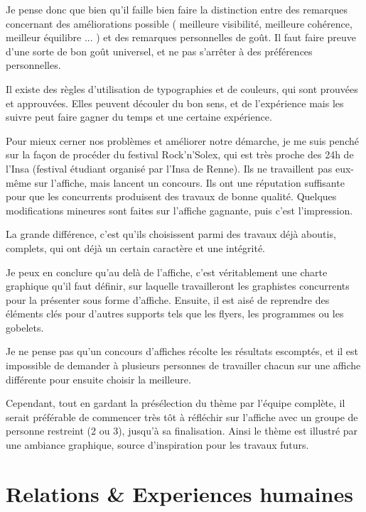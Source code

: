         Je pense donc que bien qu'il faille bien faire la distinction entre des remarques concernant des améliorations possible ( meilleure visibilité, meilleure cohérence, meilleur équilibre ... ) et des remarques personnelles de goût.
        Il faut faire preuve d'une sorte de bon goût universel, et ne pas s'arrêter à des préférences personnelles.
        
        Il existe des règles d'utilisation de typographies et de couleurs, qui sont prouvées  et approuvées. Elles peuvent découler du bon sens, et de l'expérience mais les suivre peut faire gagner du temps et une certaine expérience.

        
        Pour mieux cerner nos problèmes et améliorer notre démarche, je me suis penché sur la façon de procéder du festival Rock'n'Solex, qui est très proche des 24h de l'Insa (festival étudiant organisé par l'Insa de Renne).
        Ils ne travaillent pas eux-même sur l'affiche, mais lancent un concours. Ils ont une réputation suffisante pour que les concurrents produisent des travaux de bonne qualité.
        Quelques modifications mineures sont faites sur l'affiche gagnante, puis c'est l'impression.
        
        La grande différence, c'est qu'ils choisissent parmi des travaux déjà aboutis, complets, qui ont déjà un certain caractère et une intégrité. 
        
        Je peux en conclure qu'au delà de l'affiche, c'est véritablement une charte graphique qu'il faut définir, sur laquelle travailleront les graphistes concurrents pour la présenter sous forme d'affiche. Ensuite, il est aisé de reprendre des éléments clés pour d'autres supports tels que les flyers, les programmes ou les gobelets.
        
        Je ne pense pas qu'un concours d'affiches récolte les résultats escomptés, et il est impossible de demander à plusieurs personnes de travailler chacun sur une affiche différente pour ensuite choisir la meilleure.

        Cependant, tout en gardant la présélection du thème par l'équipe complète, il serait préférable de commencer très tôt à réfléchir sur l'affiche avec un groupe de personne restreint (2 ou 3), jusqu'à sa finalisation. Ainsi le thème est illustré par une ambiance graphique, source d'inspiration pour les travaux futurs.
        

\section{Relations & Experiences humaines}

